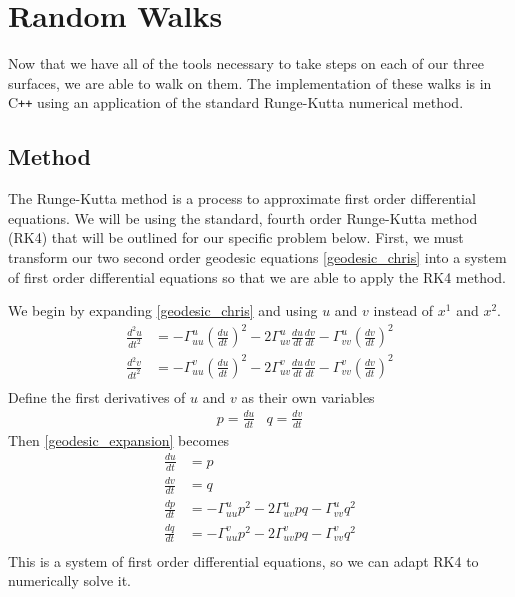 \documentclass{article}
\begin{document}
\section{Random Walks}
	Now that we have all of the tools necessary to take steps on each of our three surfaces, we are able to walk on them.
	The implementation of these walks is in C\texttt{++} using an application of the standard Runge-Kutta numerical method.
	
	\subsection{Method}
	The Runge-Kutta method is a process to approximate first order differential equations. We will be using the standard, fourth order Runge-Kutta method (RK4) that will be outlined for our specific problem below. First, we must transform our two second order geodesic equations \ref{geodesic_chris} into a system of first order differential equations so that we are able to apply the RK4 method.
	
	We begin by expanding \ref{geodesic_chris} and using $u$ and $v$ instead of $x^1$ and $x^2$.
	\begin{equation} \label{geodesic_expansion} \begin{split} 
		\frac{d^2u}{dt^2} & = -\Gamma^u_{uu}\left(\frac{du}{dt}\right)^2-2\Gamma^u_{uv}\frac{du}{dt}\frac{dv}{dt}-\Gamma^u_{vv}\left(\frac{dv}{dt}\right)^2 \\
		\frac{d^2v}{dt^2} & = -\Gamma^v_{uu}\left(\frac{du}{dt}\right)^2-2\Gamma^v_{uv}\frac{du}{dt}\frac{dv}{dt}-\Gamma^v_{vv}\left(\frac{dv}{dt}\right)^2 \\
	\end{split} \end{equation}
	Define the first derivatives of $u$ and $v$ as their own variables
	\begin{equation*} \begin{array}{cc}
		p = \frac{du}{dt} & q = \frac{dv}{dt}
	\end{array} \end{equation*}
	Then \ref{geodesic_expansion} becomes
	\begin{equation} \begin{split}
		\frac{du}{dt} & = p \\
		\frac{dv}{dt} & = q \\
		\frac{dp}{dt} & = -\Gamma^u_{uu}p^2-2\Gamma^u_{uv}pq-\Gamma^u_{vv}q^2 \\
		\frac{dq}{dt} & = -\Gamma^v_{uu}p^2-2\Gamma^v_{uv}pq-\Gamma^v_{vv}q^2 \\
	\end{split} \end{equation}
	This is a system of first order differential equations, so we can adapt RK4 to numerically solve it.
	
\end{document}
